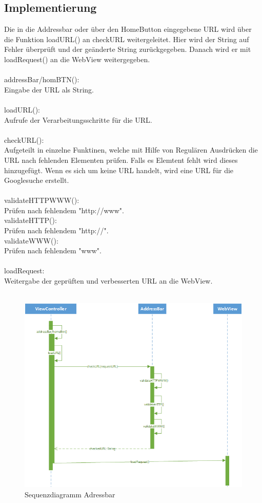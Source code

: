 \subsection{Implementierung}
Die in die Addressbar oder über den HomeButton eingegebene URL wird über die Funktion loadURL() an checkURL weitergeleitet.
Hier wird der String auf Fehler überprüft und der geänderte String zurückgegeben. Danach wird er mit loadRequest() an die
WebView weitergegeben.
\\\\
addressBar/homBTN():\\
Eingabe der URL als String.
\\\\
loadURL():\\
Aufrufe der Verarbeitungsschritte für die URL.
\\\\
checkURL():\\
Aufgeteilt in einzelne Funktinen, welche mit Hilfe von Regulären Ausdrücken die URL nach fehlenden Elementen prüfen.
Falls es Elemtent fehlt wird dieses hinzugefügt. Wenn es sich um keine URL handelt, wird eine URL für die Googlesuche erstellt.
\\\\
validateHTTPWWW():\\
Prüfen nach fehlendem "http://www".
\\
validateHTTP():\\
Prüfen nach fehlendem "http://".
\\
validateWWW():\\
Prüfen nach fehlendem "www".
\\\\
loadRequest:\\
Weitergabe der geprüften und verbesserten URL an die WebView.
\\\\
\begin{figure}
	\includegraphics[width=\textwidth]{Pics/AddressCheck.png} 
	\caption{Sequenzdiagramm Adressbar}
	\label{fig:bild}
\end{figure}



